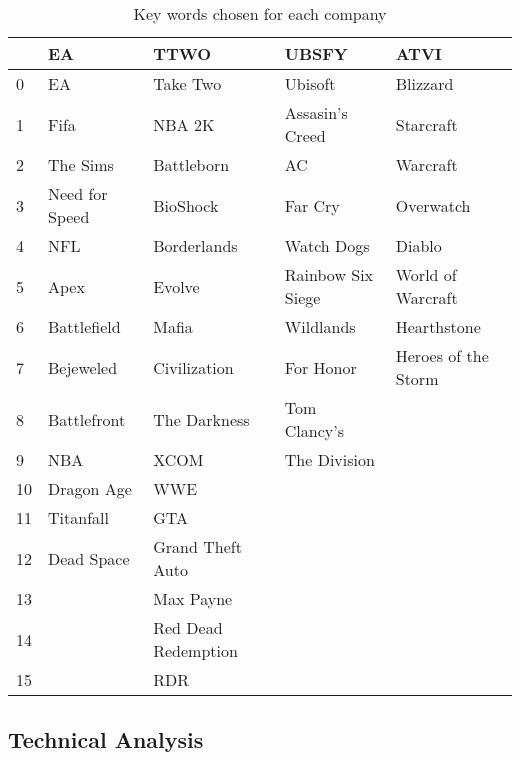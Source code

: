 \documentclass[11pt]{article} %
\begin{document}
\begin{table}[hbt!]
\centering
\caption{Key words chosen for each company}
\begin{tabular}{lllll}
\toprule
{} &              EA &                 TTWO &              UBSFY &                 ATVI \\
\midrule
0  &              EA &             Take Two &            Ubisoft &             Blizzard \\
1  &            Fifa &               NBA 2K &    Assasin's Creed &            Starcraft \\
2  &        The Sims &           Battleborn &                 AC &             Warcraft \\
3  &  Need for Speed &             BioShock &            Far Cry &            Overwatch \\
4  &             NFL &          Borderlands &         Watch Dogs &               Diablo \\
5  &            Apex &               Evolve &  Rainbow Six Siege &    World of Warcraft \\
6  &     Battlefield &                Mafia &          Wildlands &          Hearthstone \\
7  &       Bejeweled &         Civilization &          For Honor &  Heroes of the Storm \\
8  &     Battlefront &         The Darkness &       Tom Clancy's &                  \\
9  &             NBA &                 XCOM &       The Division &                  \\
10 &      Dragon Age &                  WWE &                &                  \\
11 &       Titanfall &                  GTA &                &                  \\
12 &      Dead Space &     Grand Theft Auto &                &                  \\
13 &             &            Max Payne &                &                  \\
14 &             &  Red Dead Redemption &                &                  \\
15 &             &                  RDR &                &                  \\
\bottomrule
\end{tabular}
\end{table}

\subsection{Technical Analysis}
\end{document}
